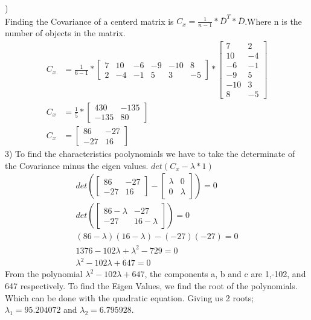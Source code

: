\documentclass[12pt,english]{article}
\begin{document}
)\\
Finding the Covariance of a centerd matrix is $C_{x} = \frac{1}{n-1} * \bar{D}^{T}*\bar{D}$.Where n is the number of objects in the matrix. 
\begin{equation*}
\begin{split}
C_{x}&= \frac{1}{6-1}
*
\begin{bmatrix}
7 & 10 & -6& -9 & -10 & 8\\
2 & -4 & -1& 5 & 3 &-5
\end{bmatrix}
*
\begin{bmatrix}
    7 &  2 \\
  10 & -4 \\
   -6 & -1 \\
   -9 &  5 \\
 -10 &  3 \\
    8 & -5 
\end{bmatrix}\\
C_{x} &= \frac{1}{5}
*
\begin{bmatrix}
430 & -135 \\
-135 & 80
\end{bmatrix}\\
C_{x} &= 
\begin{bmatrix}
86 & -27 \\
-27 & 16
\end{bmatrix}
\end{split}
\end{equation*}
3) To find the characteristics poolynomials we have to take the determinate of the Covariance minus the eigen values. 
$det(C_{x} -\lambda *1)$
\begin{equation*}
\begin{split}
det(
\begin{bmatrix}
86 & -27 \\
-27 & 16
\end{bmatrix}
- 
\begin{bmatrix}
\lambda & 0 \\
0 & \lambda
\end{bmatrix}) = 0\\
det(
\begin{bmatrix}
86 - \lambda & -27 \\
-27 & 16 - \lambda
\end{bmatrix}) = 0\\
(86-\lambda)(16-\lambda) - (-27)(-27) = 0\\
1376 -102\lambda + \lambda^{2} - 729 = 0\\
\lambda^{2} -102\lambda + 647 = 0
\end{split}
\end{equation*}
From the polynomial $\lambda^{2} -102\lambda + 647 $, the components a, b and c are 1,-102, and 647 respectively. To find the Eigen Values, we find the root of the polynomials. Which can be done with the quadratic equation. Giving us 2  roots; $\lambda_{1} = 95.204072$ and $\lambda_{2} = 6.795928$.
\end{document}
